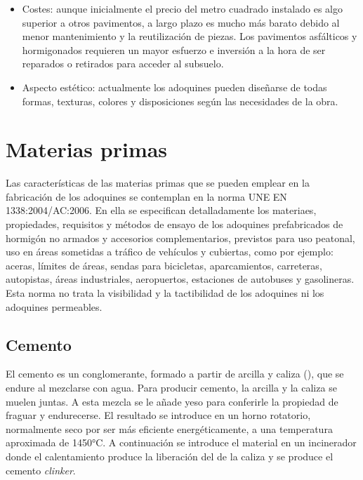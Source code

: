 \begin{itemize}
\item Costes: aunque inicialmente el precio del metro cuadrado instalado es algo superior a otros pavimentos, a largo plazo es mucho más barato debido al menor mantenimiento y la reutilización de piezas. Los pavimentos asfálticos y hormigonados requieren un mayor esfuerzo e inversión a la hora de ser reparados o retirados para acceder al subsuelo.

\item Aspecto estético: actualmente los adoquines pueden diseñarse de todas formas, texturas, colores y disposiciones según las necesidades de la obra.
\end{itemize}

\section{Materias primas}
Las características de las materias primas que se pueden emplear en la fabricación de los adoquines se contemplan en la norma UNE EN 1338:2004/AC:2006. En ella se especifican detalladamente los materiaes, propiedades, requisitos y métodos de ensayo de los adoquines prefabricados de hormigón no armados y accesorios complementarios, previstos para uso peatonal, uso en áreas sometidas a tráfico de vehículos y cubiertas, como por ejemplo: aceras, límites de áreas, sendas para bicicletas, aparcamientos, carreteras, autopistas, áreas industriales, aeropuertos, estaciones de autobuses y gasolineras. Esta norma no trata la visibilidad y la tactibilidad de los adoquines ni los adoquines permeables.

\subsection{Cemento}
El cemento es un conglomerante, formado a partir de arcilla y caliza (), que se endure al mezclarse con agua. Para producir cemento, la arcilla y la caliza se muelen juntas. A esta mezcla se le añade yeso para conferirle la propiedad de fraguar y endurecerse. El resultado se introduce en un horno rotatorio, normalmente seco por ser más eficiente energéticamente, a una temperatura aproximada de 1450\si{\celsius}. A continuación se introduce el material en un incinerador donde el calentamiento produce la liberación del  de la caliza y se produce el cemento \emph{clinker}.

\begin{center}
\end{center}

